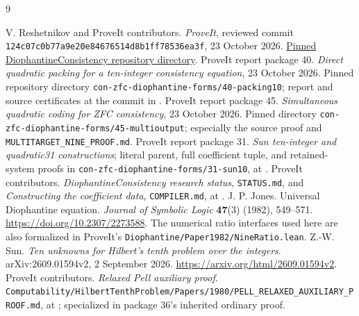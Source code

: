 \documentclass[11pt]{article}
\theoremstyle{definition}\newtheorem{definition}[theorem]{Definition}
\theoremstyle{remark}\newtheorem{remark}[theorem]{Remark}
\begin{document}
\begin{thebibliography}{9}
\raggedright
{} V. Reshetnikov and ProveIt contributors.
\emph{ProveIt}, reviewed commit
\texttt{124c07c0b77a9e20e84676514d8b1ff78536ea3f}, 23 October 2026.
\href{https://github.com/VladimirReshetnikov/ProveIt/tree/124c07c0b77a9e20e84676514d8b1ff78536ea3f/Computability/DiophantineConsistency}{Pinned DiophantineConsistency repository directory}.
 ProveIt report package 40.
\emph{Direct quadratic packing for a ten-integer consistency equation},
23 October 2026. Pinned repository directory
\texttt{con-zfc-diophantine-forms/40-packing10}; report and source certificates
at the commit in \cite{repo}.
 ProveIt report package 45.
\emph{Simultaneous quadratic coding for ZFC consistency}, 23 October 2026.
Pinned directory \texttt{con-zfc-diophantine-forms/45-multioutput};
especially the source proof and \texttt{MULTITARGET\_NINE\_PROOF.md}.
 ProveIt report package 31.
\emph{Sun ten-integer and quadratic31 constructions}; literal parent,
full coefficient tuple, and retained-system proofs in
\texttt{con-zfc-diophantine-forms/31-sun10}, at \cite{repo}.
 ProveIt contributors. \emph{DiophantineConsistency research
status}, \texttt{STATUS.md}, and \emph{Constructing the coefficient data},
\texttt{COMPILER.md}, at \cite{repo}.
 J. P. Jones. Universal Diophantine equation.
\emph{Journal of Symbolic Logic} \textbf{47}(3) (1982), 549--571.
\url{https://doi.org/10.2307/2273588}.
The numerical ratio interfaces used here are also formalized in ProveIt's
\texttt{Diophantine/Paper1982/NineRatio.lean}.
 Z.-W. Sun. \emph{Ten unknowns for Hilbert's tenth problem
over the integers}. arXiv:2609.01594v2, 2 September 2026.
\url{https://arxiv.org/html/2609.01594v2}.
 ProveIt contributors. \emph{Relaxed Pell auxiliary proof}.
\nolinkurl{Computability/HilbertTenthProblem/Papers/1980/PELL_RELAXED_AUXILIARY_PROOF.md},
at \cite{repo}; specialized in package 36's inherited ordinary proof.
\end{thebibliography}
\end{document}
